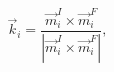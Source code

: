 \documentclass[preview]{standalone}
\begin{document}
\begin{varwidth}{50in}
  \begin{equation}
    \vec{k}_i =  
    \frac{\vec{m}_i^I \times \vec{m}_i^F}{\left|\vec{m}_i^I 
    \times \vec{m}_i^F\right|} 
  , \nonumber
  \end{equation}
\end{varwidth}
\end{document}
